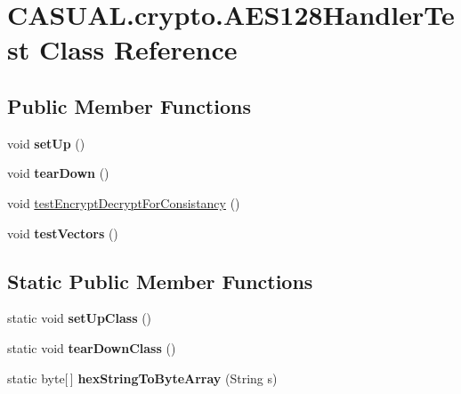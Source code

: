 \hypertarget{classCASUAL_1_1crypto_1_1AES128HandlerTest}{\section{C\-A\-S\-U\-A\-L.\-crypto.\-A\-E\-S128\-Handler\-Test Class Reference}
\label{classCASUAL_1_1crypto_1_1AES128HandlerTest}
}
\subsection*{Public Member Functions}
\begin{DoxyCompactItemize}
\item 
\hypertarget{classCASUAL_1_1crypto_1_1AES128HandlerTest_a0904bd896848358b77288a11c04f9edd}{void {\bfseries set\-Up} ()}\label{classCASUAL_1_1crypto_1_1AES128HandlerTest_a0904bd896848358b77288a11c04f9edd}

\item 
\hypertarget{classCASUAL_1_1crypto_1_1AES128HandlerTest_ab84b3869bceb7cc35617c90529c21f7e}{void {\bfseries tear\-Down} ()}\label{classCASUAL_1_1crypto_1_1AES128HandlerTest_ab84b3869bceb7cc35617c90529c21f7e}

\item 
void \hyperlink{classCASUAL_1_1crypto_1_1AES128HandlerTest_a73233834a3d1d94d9b09e8497c908d53}{test\-Encrypt\-Decrypt\-For\-Consistancy} ()
\item 
\hypertarget{classCASUAL_1_1crypto_1_1AES128HandlerTest_af89670b934aadb3d920945c3642002a2}{void {\bfseries test\-Vectors} ()}\label{classCASUAL_1_1crypto_1_1AES128HandlerTest_af89670b934aadb3d920945c3642002a2}

\end{DoxyCompactItemize}
\subsection*{Static Public Member Functions}
\begin{DoxyCompactItemize}
\item 
\hypertarget{classCASUAL_1_1crypto_1_1AES128HandlerTest_a5c3c11d19d50fcf9a6590a3bf622e73b}{static void {\bfseries set\-Up\-Class} ()}\label{classCASUAL_1_1crypto_1_1AES128HandlerTest_a5c3c11d19d50fcf9a6590a3bf622e73b}

\item 
\hypertarget{classCASUAL_1_1crypto_1_1AES128HandlerTest_a554b66812ee28a736de359728da0fae7}{static void {\bfseries tear\-Down\-Class} ()}\label{classCASUAL_1_1crypto_1_1AES128HandlerTest_a554b66812ee28a736de359728da0fae7}

\item 
\hypertarget{classCASUAL_1_1crypto_1_1AES128HandlerTest_a0593194f0ac99447711128bc9cb5e71a}{static byte\mbox{[}$\,$\mbox{]} {\bfseries hex\-String\-To\-Byte\-Array} (String s)}\label{classCASUAL_1_1crypto_1_1AES128HandlerTest_a0593194f0ac99447711128bc9cb5e71a}

\end{DoxyCompactItemize}


